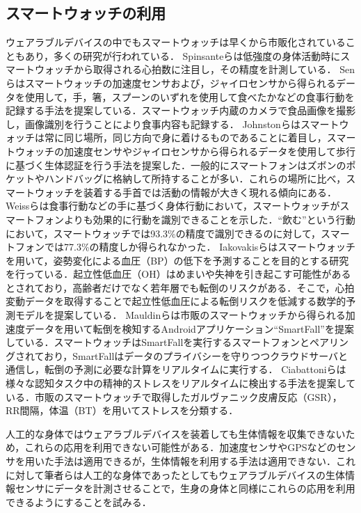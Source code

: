\documentclass[Japanese,noauthor]{dicomopapers}
\begin{document}
\subsection{スマートウォッチの利用}
ウェアラブルデバイスの中でもスマートウォッチは早くから市販化されていることもあり，多くの研究が行われている．
Spinsanteら\cite{accuracy_in_low_intensity}は低強度の身体活動時にスマートウォッチから取得される心拍数に注目し，その精度を計測している．
Senら\cite{eating_recognition}はスマートウォッチの加速度センサおよび，ジャイロセンサから得られるデータを使用して，手，箸，スプーンのいずれを使用して食べたかなどの食事行動を記録する手法を提案している．スマートウォッチ内蔵のカメラで食品画像を撮影し，画像識別を行うことにより食事内容も記録する．
Johnstonら\cite{smartwatch_walk_authentication}はスマートウォッチは常に同じ場所，同じ方向で身に着けるものであることに着目し，スマートウォッチの加速度センサやジャイロセンサから得られるデータを使用して歩行に基づく生体認証を行う手法を提案した．一般的にスマートフォンはズボンのポケットやハンドバッグに格納して所持することが多い．これらの場所に比べ，スマートウォッチを装着する手首では活動の情報が大きく現れる傾向にある．
Weissら\cite{smartwatch_activity_recognition}は食事行動などの手に基づく身体行動において，スマートウォッチがスマートフォンよりも効果的に行動を識別できることを示した．``飲む''という行動において，スマートウォッチでは93.3\%の精度で識別できるのに対して，スマートフォンでは77.3\%の精度しか得られなかった．
Iakovakisら\cite{oh_detection}はスマートウォッチを用いて，姿勢変化による血圧（BP）の低下を予測することを目的とする研究を行っている．起立性低血圧（OH）はめまいや失神を引き起こす可能性があるとされており，高齢者だけでなく若年層でも転倒のリスクがある．そこで，心拍変動データを取得することで起立性低血圧による転倒リスクを低減する数学的予測モデルを提案している．
Mauldinら\cite{smartfall}は市販のスマートウォッチから得られる加速度データを用いて転倒を検知するAndroidアプリケーション``SmartFall''を提案している．スマートウォッチはSmartFallを実行するスマートフォンとペアリングされており，SmartFallはデータのプライバシーを守りつつクラウドサーバと通信し，転倒の予測に必要な計算をリアルタイムに実行する．
Ciabattoniら\cite{smartwatch_stress_detection}は様々な認知タスク中の精神的ストレスをリアルタイムに検出する手法を提案している．市販のスマートウォッチで取得したガルヴァニック皮膚反応（GSR），RR間隔，体温（BT）を用いてストレスを分類する．\par

人工的な身体ではウェアラブルデバイスを装着しても生体情報を収集できないため，これらの応用を利用できない可能性がある．加速度センサやGPSなどのセンサを用いた手法は適用できるが，生体情報を利用する手法は適用できない．これに対して筆者らは人工的な身体であったとしてもウェアラブルデバイスの生体情報センサにデータを計測させることで，生身の身体と同様にこれらの応用を利用できるようにすることを試みる．
\end{document}
